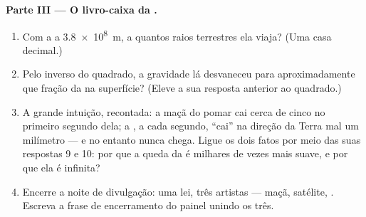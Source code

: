 \begin{problem}
\medskip\noindent\textbf{Parte III --- O livro-caixa da .}
\begin{enumerate}[resume]
  \item Com a  a \qty{3.8e8}{m}, a quantos raios terrestres ela
        viaja? (Uma casa decimal.)
  \item Pelo inverso do quadrado, a gravidade lá desvaneceu para
        aproximadamente que fração da  na superfície? (Eleve a
        sua resposta anterior ao quadrado.)
  \item A grande intuição, recontada: a maçã do pomar cai cerca de
        cinco  no primeiro segundo dela; a , a cada segundo,
        ``cai'' na direção da Terra mal um milímetro --- e no entanto
        nunca chega. Ligue os dois fatos por meio das suas respostas
        9 e 10: por que a queda da  é milhares de vezes mais suave,
        e por que ela é infinita?
  \item Encerre a noite de divulgação: uma lei, três artistas ---
        maçã, satélite, . Escreva a frase de encerramento do
        painel unindo os três.
\end{enumerate}
\end{problem}
